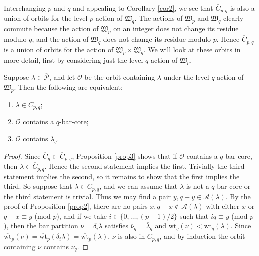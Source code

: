 \documentclass[ALCO, Unicode,published]{cedram}
\newcommand*\nicefrac[2]{#1/#2}
\begin{document}
Interchanging $p$ and $q$ and appealing to Corollary \ref{cor2}, we see that $\overline{C}_{p,q}$ is also a union of orbits for the level $p$ action of $\mathfrak{W}_q$. The actions of $\mathfrak{W}_p$ and $\mathfrak{W}_q$ clearly commute because the action of $\mathfrak{W}_p$ on an integer does not change its residue modulo $q$, and the action of $\mathfrak{W}_q$ does not change its residue modulo $p$. Hence $\overline{C}_{p,q}$ is a union of orbits for the action of $\mathfrak{W}_p\times\mathfrak{W}_q$. We will look at these orbits in more detail, first by considering just the level $q$ action of $\mathfrak{W}_p$.

\begin{prop} \label{prop4}
Suppose $\lambda\in\overline{\mathcal{P}}$, and let $\mathcal{O}$ be the orbit containing $\lambda$ under the level $q$ action of $\mathfrak{W}_p$. Then the following are equivalent: \begin{enumerate}
\item $\lambda\in\overline{C}_{p,q}$; 
\item $\mathcal{O}$ contains a $q$-bar-core; 
\item $\mathcal{O}$ contains $\overline{\lambda}_q$.
\end{enumerate}
\end{prop}
\begin{proof}
Since $\overline{C}_q\subset\overline{C}_{p,q}$, Proposition \ref{prop3} shows that if $\mathcal{O}$ contains a $q$-bar-core, then $\lambda\in\overline{C}_{p,q}$. Hence the second statement implies the first. Trivially the third statement implies the second, so it remains to show that the first implies the third. So suppose that $\lambda\in\overline{C}_{p,q}$, and we can assume that $\lambda$ is not a $q$-bar-core or the third statement is trivial. Thus we may find a pair $y,q-y\in\mathcal{A}(\lambda)$. By the proof of Proposition \ref{prop2}, there are no pairs $x,q-x\not\in\mathcal{A}(\lambda)$ with either $x$ or $q-x\equiv y$ (mod $p$), and if we take $i\in\{0,\dots,\nicefrac{(p-1)}{2}\}$ such that $iq\equiv y$ (mod $p$), then the bar partition $\nu=\delta_i\lambda$ satisfies $\overline{\nu}_q=\overline{\lambda}_q$ and $\overline{\text{wt}}_q(\nu)<\overline{\text{wt}}_q(\lambda)$. Since $\overline{\text{wt}}_p(\nu)=\overline{\text{wt}}_p(\delta_i\lambda)=\overline{\text{wt}}_p(\lambda)$, $\nu$ is also in $\overline{C}_{p,q}$, and by induction the orbit containing $\nu$ contains $\overline{\nu}_q$.
\end{proof}
\end{document}
